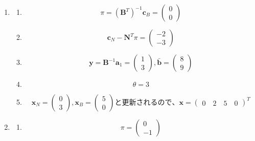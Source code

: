 \documentclass[a4paper,12pt]{jsarticle}
\begin{document}
\begin{enumerate}
  \item
        \begin{enumerate}
          \item \[\pi =(\bm{B}^T)^{-1}\bm{c}_B=
                  \begin{pmatrix}
                    0 \\0
                  \end{pmatrix}\]
          \item \[\bm{c}_N-\bm{N}^T\pi=
                  \begin{pmatrix}
                    -2 \\-3
                  \end{pmatrix}\]
          \item \[\bm{y}=\bm{B}^{-1}\bm{a}_1=
                  \begin{pmatrix}
                    1 \\3
                  \end{pmatrix}
                  ,\bar{\bm{b}}=
                  \begin{pmatrix}
                    8 \\9
                  \end{pmatrix}\]
          \item \[\theta =3\]
          \item \[\bm{x}_N=
                  \begin{pmatrix}
                    0 \\3
                  \end{pmatrix}
                  ,\bm{x}_B=
                  \begin{pmatrix}
                    5 \\0
                  \end{pmatrix}と更新されるので、
                  \bm{x}=
                  \begin{pmatrix}
                    0\quad 2\quad 5\quad 0
                  \end{pmatrix}^T\]
        \end{enumerate}
  \item
        \begin{enumerate}
          \item \[\pi =
                  \begin{pmatrix}
                    0 \\-1
                  \end{pmatrix}\]

\end{enumerate}
\end{enumerate}
\end{document}
